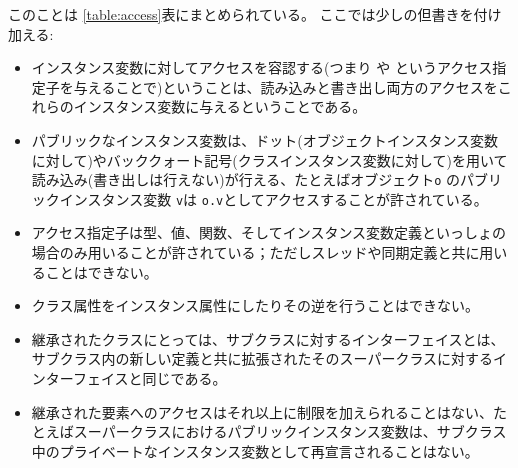 \documentclass[\pformat,12pt]{jarticle}
\begin{document}
このことは \ref{table:access}表にまとめられている。
ここでは少しの但書きを付け加える: 
\begin{itemize}
\item インスタンス変数に対してアクセスを容認する(つまり や というアクセス指定子を与えることで)ということは、読み込みと書き出し両方のアクセスをこれらのインスタンス変数に与えるということである。
\item パブリックなインスタンス変数は、ドット(オブジェクトインスタンス変数に対して)やバッククォート記号(クラスインスタンス変数に対して)を用いて読み込み(書き出しは行えない)が行える、たとえばオブジェクト\texttt{o} のパブリックインスタンス変数 \texttt{v}は \texttt{o.v}としてアクセスすることが許されている。
\item アクセス指定子は型、値、関数、そしてインスタンス変数定義といっしょの場合のみ用いることが許されている；ただしスレッドや同期定義と共に用いることはできない。\item クラス属性をインスタンス属性にしたりその逆を行うことはできない。
\item 継承されたクラスにとっては、サブクラスに対するインターフェイスとは、サブクラス内の新しい定義と共に拡張されたそのスーパークラスに対するインターフェイスと同じである。
\item 継承された要素へのアクセスはそれ以上に制限を加えられることはない、たとえばスーパークラスにおけるパブリックインスタンス変数は、サブクラス中のプライベートなインスタンス変数として再宣言されることはない。
\end{itemize} 
\end{document}
